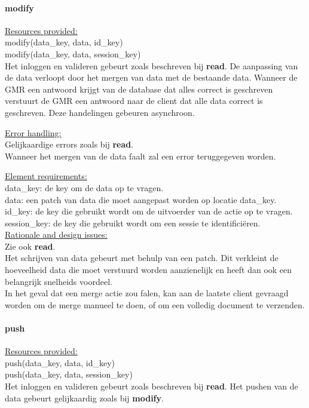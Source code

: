 \documentclass[a4paper,10pt]{article}
\begin{document}
\paragraph{modify}
\underline{Resources provided:}\\
modify(data\_key, data, id\_key)\\
modify(data\_key, data, session\_key)\\
Het inloggen en valideren gebeurt zoals beschreven bij \textbf{read}.
De aanpassing van de data verloopt door het mergen van data met de bestaande data.  Wanneer de GMR een antwoord krijgt van de database dat alles correct is geschreven verstuurt de GMR een antwoord naar de client dat alle data correct is geschreven.  Deze handelingen gebeuren asynchroon.


\underline{Error handling:}\\
Gelijkaardige errors zoals bij \textbf{read}.\\
Wanneer het mergen van de data faalt zal een error teruggegeven worden.

\underline{Element requirements:}\\
data\_key: de key om de data op te vragen.\\
data: een patch van data die moet aangepast worden op locatie data\_key.\\ 
id\_key: de key die gebruikt wordt om de uitvoerder van de actie op te vragen.\\
session\_key: de key die gebruikt wordt om een sessie te identifici\"{e}ren.\\

\underline{Rationale and design issues:}\\
Zie ook \textbf{read}.\\
Het schrijven van data gebeurt met behulp van een patch.  Dit verkleint de hoeveelheid data die moet verstuurd worden aanzienelijk en heeft dan ook een belangrijk snelheids voordeel.\\
In het geval dat een merge actie zou falen, kan aan de laatste client gevraagd worden om de merge manueel te doen, of om een volledig document te verzenden.

\paragraph{push}
\underline{Resources provided:}\\
push(data\_key, data, id\_key)\\
push(data\_key, data, session\_key)\\
Het inloggen en valideren gebeurt zoals beschreven bij \textbf{read}.
Het pushen van de data gebeurt gelijkaardig zoals bij \textbf{modify}.
\end{document}
